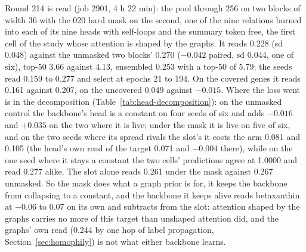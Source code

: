 Round 214 is read (job 2901, 4 h 22 min): the pool through 256 on two blocks of width
36 with the 020 hard mask on the second, one of the nine relations burned into each of
its nine heads with self-loops and the summary token free, the first cell of the study
whose attention is shaped by the graphs. It reads 0.228 (sd 0.048) against the unmasked
two blocks' 0.270 ($-0.042$ paired, sd 0.044, one of six), top-50 3.66 against 4.13,
ensembled 0.253 with a top-50 of 5.79; the seeds read 0.159 to 0.277 and select at
epochs 21 to 194. On the covered genes it reads 0.161 against 0.207, on the uncovered
0.049 against $-0.015$. Where the loss went is in the decomposition
(Table~\ref{tab:head-decomposition}): on the unmasked control the backbone's head is a
constant on four seeds of six and adds $-0.016$ and $+0.035$ on the two where it is
live; under the mask it is live on five of six, and on the two seeds where its spread
rivals the slot's it costs the arm 0.081 and 0.105 (the head's own read of the target
0.071 and $-0.004$ there), while on the one seed where it stays a constant the two
cells' predictions agree at 1.0000 and read 0.277 alike. The slot alone reads 0.261
under the mask against 0.267 unmasked. So the mask does what a graph prior is for, it
keeps the backbone from collapsing to a constant, and the backbone it keeps alive reads
betaxanthin at $-0.06$ to 0.07 on its own and subtracts from the slot: attention shaped
by the graphs carries no more of this target than unshaped attention did, and the
graphs' own read (0.244 by one hop of label propagation, Section~\ref{sec:homophily})
is not what either backbone learns.

